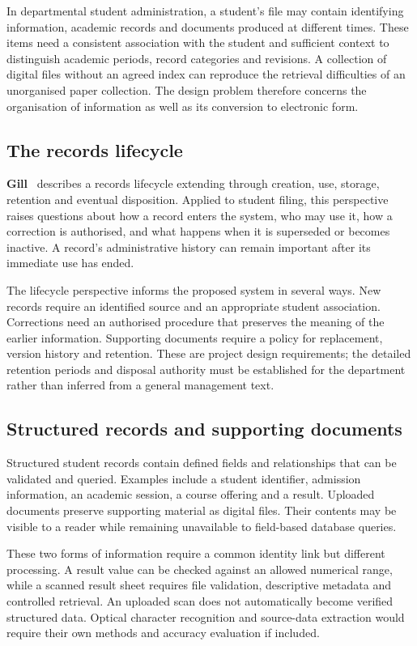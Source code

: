 In departmental student administration, a student's file may contain identifying information, academic records and documents produced at different times. These items need a consistent association with the student and sufficient context to distinguish academic periods, record categories and revisions. A collection of digital files without an agreed index can reproduce the retrieval difficulties of an unorganised paper collection. The design problem therefore concerns the organisation of information as well as its conversion to electronic form.

\subsection{The records lifecycle}\label{sec:2-2-2}

\textbf{Gill}~\cite{gill1993} describes a records lifecycle extending through creation, use, storage, retention and eventual disposition. Applied to student filing, this perspective raises questions about how a record enters the system, who may use it, how a correction is authorised, and what happens when it is superseded or becomes inactive. A record's administrative history can remain important after its immediate use has ended.

The lifecycle perspective informs the proposed system in several ways. New records require an identified source and an appropriate student association. Corrections need an authorised procedure that preserves the meaning of the earlier information. Supporting documents require a policy for replacement, version history and retention. These are project design requirements; the detailed retention periods and disposal authority must be established for the department rather than inferred from a general management text.

\subsection{Structured records and supporting documents}\label{sec:2-2-3}

Structured student records contain defined fields and relationships that can be validated and queried. Examples include a student identifier, admission information, an academic session, a course offering and a result. Uploaded documents preserve supporting material as digital files. Their contents may be visible to a reader while remaining unavailable to field-based database queries.

These two forms of information require a common identity link but different processing. A result value can be checked against an allowed numerical range, while a scanned result sheet requires file validation, descriptive metadata and controlled retrieval. An uploaded scan does not automatically become verified structured data. Optical character recognition and source-data extraction would require their own methods and accuracy evaluation if included.

